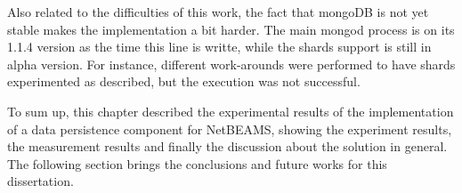 Also related to the difficulties of this work, the fact that mongoDB is not yet
stable makes the implementation a bit harder. The main mongod process is on its
1.1.4 version as the time this line is writte, while the shards support is
still in alpha version. For instance, different work-arounds were performed to
have shards experimented as described, but the execution was not successful.

To sum up, this chapter described the experimental results of the
implementation of a data persistence component for NetBEAMS, showing the
experiment results, the measurement results and finally the discussion about
the solution in general. The following section brings the conclusions and
future works for this dissertation.
